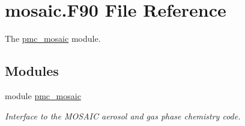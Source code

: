 \hypertarget{mosaic_8_f90}{}\section{mosaic.\+F90 File Reference}
\label{mosaic_8_f90}


The \mbox{\hyperlink{namespacepmc__mosaic}{pmc\+\_\+mosaic}} module.  


\subsection*{Modules}
\begin{DoxyCompactItemize}
\item 
module \mbox{\hyperlink{namespacepmc__mosaic}{pmc\+\_\+mosaic}}
\begin{DoxyCompactList}\small\item\em Interface to the M\+O\+S\+A\+IC aerosol and gas phase chemistry code. \end{DoxyCompactList}\end{DoxyCompactItemize}
